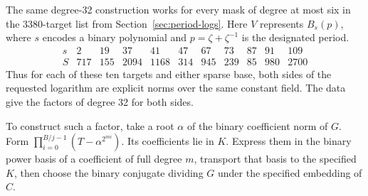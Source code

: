 \documentclass[11pt]{article}
\begin{document}
The same degree-32 construction works for every mask of degree at
most six in the 3380-target list from Section~\ref{sec:period-logs}.
Here \(V\) represents \(B_s(p)\), where \(s\) encodes a binary
polynomial and \(p=\zeta+\zeta^{-1}\) is the designated period.
\[
\begin{array}{c|rrrrrrrrrr}
 s&2&19&37&41&47&67&73&87&91&109\\ \hline
 S&717&155&2094&1168&314&945&239&85&980&2700
\end{array}
\]
Thus for each of these ten targets and either sparse base, both sides
of the requested logarithm are explicit norms over the same constant
field. The data give the factors of degree 32 for both sides.

To construct such a factor, take a root \(\alpha\) of the binary
coefficient norm of \(G\). Form
\(\prod_{i=0}^{B/j-1}(T-\alpha^{2^{mi}})\).
Its coefficients lie in \(K\). Express them in the binary power basis
of a coefficient of full degree \(m\), transport that basis to the
specified \(K\), then choose the binary conjugate dividing \(G\) under
the specified embedding of \(C\).
\end{document}
